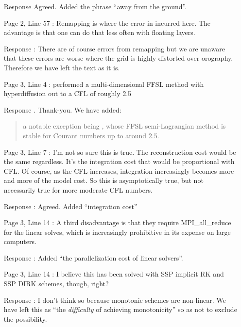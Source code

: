 \documentclass[12pt]{article}
\begin{document}
\begin{enumerate}
\item [Response] Agreed. Added the phrase ``away from the ground''.

\item [Page 2, Line 57]: Remapping is where the error in incurred here. The advantage is that one can do that less often with floating layers.

\item [Response]: There are of course errors from remapping but we are unaware that these errors are worse where the grid is highly distorted over orography. Therefore we have left the text as it is.

\item [Page 3, Line 4]: \cite{UN14} performed a multi-dimensional FFSL method with hyperdiffusion out to a CFL of roughly 2.5

\item [Response]. Thank-you. We have added:
\begin{quote}
a notable exception being \cite{UN14}, whose FFSL semi-Lagrangian method is stable for Courant numbers up to around 2.5.
\end{quote}

\item [Page 3, Line 7]: I'm not so sure this is true. The reconstruction cost would be the same regardless. It's the integration cost that would be proportional with CFL. Of course, as the CFL increases, integration increasingly becomes more and more of the model cost. So this is asymptotically true, but not necessarily true for more moderate CFL numbers.

\item [Response]: Agreed. Added ``integration cost''

\item [Page 3, Line 14]: A third disadvantage is that they require MPI\_all\_reduce for the linear solves, which is increasingly prohibitive in its expense on large computers.

\item [Response]: Added ``the parallelization cost of linear solvers''.

\item [Page 3, Line 14]: I believe this has been solved with SSP implicit RK and SSP DIRK schemes, though, right?

\item [Response]: I don't think so because monotonic schemes are non-linear. We have left this as ``the \emph{difficulty} of achieving monotonicity'' so as not to exclude the possibility. 


\end{enumerate}
\end{document}
